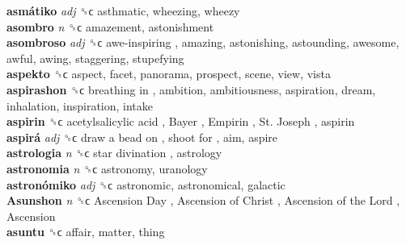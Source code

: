 \textbf{asmátiko} \emph{adj}  ␝ϲ  asthmatic, wheezing, wheezy  \\
\textbf{asombro} \emph{n}  ␝ϲ  amazement, astonishment  \\
\textbf{asombroso} \emph{adj}  ␝ϲ   awe-inspiring , amazing, astonishing, astounding, awesome, awful, awing, staggering, stupefying  \\
\textbf{aspekto} ␝ϲ  aspect, facet, panorama, prospect, scene, view, vista  \\
\textbf{aspirashon} ␝ϲ   breathing in , ambition, ambitiousness, aspiration, dream, inhalation, inspiration, intake  \\
\textbf{aspirin} ␝ϲ   acetylsalicylic acid ,  Bayer ,  Empirin ,  St. Joseph , aspirin  \\
\textbf{aspirá} \emph{adj}  ␝ϲ   draw a bead on ,  shoot for , aim, aspire  \\
\textbf{astrologia} \emph{n}  ␝ϲ   star divination , astrology  \\
\textbf{astronomia} \emph{n}  ␝ϲ  astronomy, uranology  \\
\textbf{astronómiko} \emph{adj}  ␝ϲ  astronomic, astronomical, galactic  \\
\textbf{Asunshon} \emph{n}  ␝ϲ   Ascension Day ,  Ascension of Christ ,  Ascension of the Lord ,  Ascension   \\
\textbf{asuntu} ␝ϲ  affair, matter, thing  \\
